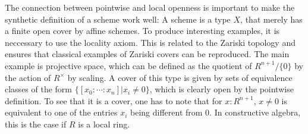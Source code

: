 The connection between pointwise and local openness is important to make the synthetic definition of a scheme work well:
A scheme is a type $X$, that merely has a finite open cover by affine schemes.
To produce interesting examples, it is neccessary to use the locality axiom.
This is related to the Zariski topology and ensures that classical examples of Zariski covers can be reproduced.
The main example is projective space, which can be defined as the quotient of $R^{n+1}/\{0\}$ by the action of $R^\times$ by scaling.
A cover of this type is given by sets of equivalence classes of the form $\{[x_0:\cdots:x_n] \vert x_i\neq 0 \}$, which is clearly open by the pointwise definition.
To see that it is a cover, one has to note that for $x:R^{n+1}$, $x\neq 0$ is equivalent to one of the entries $x_i$ being different from 0. In constructive algebra, this is the case if $R$ is a local ring.
